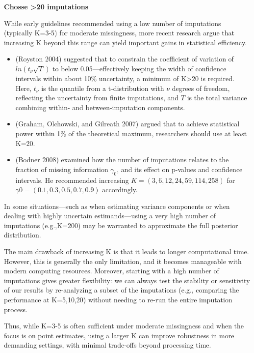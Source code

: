 \documentclass{article}
\providecommand{\tightlist}{%
  \setlength{\itemsep}{0pt}\setlength{\parskip}{0pt}}
\begin{document}
\textbf{Chosse \textgreater20 imputations}

While early guidelines recommended using a low number of imputations
(typically K=3-5) for moderate missingness, more recent research argue
that increasing K beyond this range can yield important gains in
statistical efficiency.

\begin{itemize}
\tightlist
\item
  (Royston 2004) suggested that to constrain the coefficient of
  variation of \(ln(t_{\nu}\sqrt{T})\) to below 0.05---effectively
  keeping the width of confidence intervals within about 10\%
  uncertainty, a minimum of K\textgreater20 is required. Here,
  \(t_{\nu}\) is the quantile from a t-distribution with \({\nu}\)
  degrees of freedom, reflecting the uncertainty from finite
  imputations, and \(T\) is the total variance combining within- and
  between-imputation components.
\item
  (Graham, Olchowski, and Gilreath 2007) argued that to achieve
  statistical power within 1\% of the theoretical maximum, researchers
  should use at least K=20.
\item
  (Bodner 2008) examined how the number of imputations relates to the
  fraction of missing information \(\gamma_{0}\), and its effect on
  p-values and confidence intervals. He recommended increasing
  \(K=(3,6,12,24,59,114,258)\) for \(\gamma0=(0.1, 0.3, 0.5, 0.7, 0.9)\)
  accordingly.
\end{itemize}

In some situations---such as when estimating variance components or when
dealing with highly uncertain estimands---using a very high number of
imputations (e.g.,K=200) may be warranted to approximate the full
posterior distribution.

The main drawback of increasing K is that it leads to longer
computational time. However, this is generally the only limitation, and
it becomes manageable with modern computing resources. Moreover,
starting with a high number of imputations gives greater flexibility: we
can always test the stability or sensitivity of our results by
re-analyzing a subset of the imputations (e.g., comparing the
performance at K=5,10,20) without needing to re-run the entire
imputation process.

Thus, while K=3-5 is often sufficient under moderate missingness and
when the focus is on point estimates, using a larger K can improve
robustness in more demanding settings, with minimal trade-offs beyond
processing time.
\end{document}
